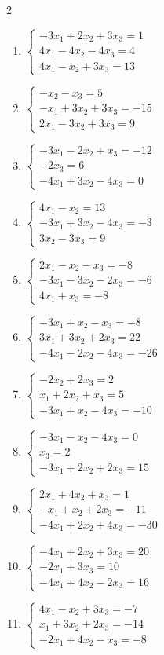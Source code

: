 \begin{multicols}{2}
\begin{enumerate}[label=\arabic*., leftmargin=*]
\item $\begin{cases}-3x_1+2x_2+3x_3=1\\4x_1-4x_2-4x_3=4\\4x_1-x_2+3x_3=13\end{cases}$
\item $\begin{cases}-x_2-x_3=5\\-x_1+3x_2+3x_3=-15\\2x_1-3x_2+3x_3=9\end{cases}$
\item $\begin{cases}-3x_1-2x_2+x_3=-12\\-2x_3=6\\-4x_1+3x_2-4x_3=0\end{cases}$
\item $\begin{cases}4x_1-x_2=13\\-3x_1+3x_2-4x_3=-3\\3x_2-3x_3=9\end{cases}$
\item $\begin{cases}2x_1-x_2-x_3=-8\\-3x_1-3x_2-2x_3=-6\\4x_1+x_3=-8\end{cases}$
\item $\begin{cases}-3x_1+x_2-x_3=-8\\3x_1+3x_2+2x_3=22\\-4x_1-2x_2-4x_3=-26\end{cases}$
\item $\begin{cases}-2x_2+2x_3=2\\x_1+2x_2+x_3=5\\-3x_1+x_2-4x_3=-10\end{cases}$
\item $\begin{cases}-3x_1-x_2-4x_3=0\\x_3=2\\-3x_1+2x_2+2x_3=15\end{cases}$
\item $\begin{cases}2x_1+4x_2+x_3=1\\-x_1+x_2+2x_3=-11\\-4x_1+2x_2+4x_3=-30\end{cases}$
\item $\begin{cases}-4x_1+2x_2+3x_3=20\\-2x_1+3x_3=10\\-4x_1+4x_2-2x_3=16\end{cases}$
\item $\begin{cases}4x_1-x_2+3x_3=-7\\x_1+3x_2+2x_3=-14\\-2x_1+4x_2-x_3=-8\end{cases}$
\end{enumerate}
\end{multicols}

